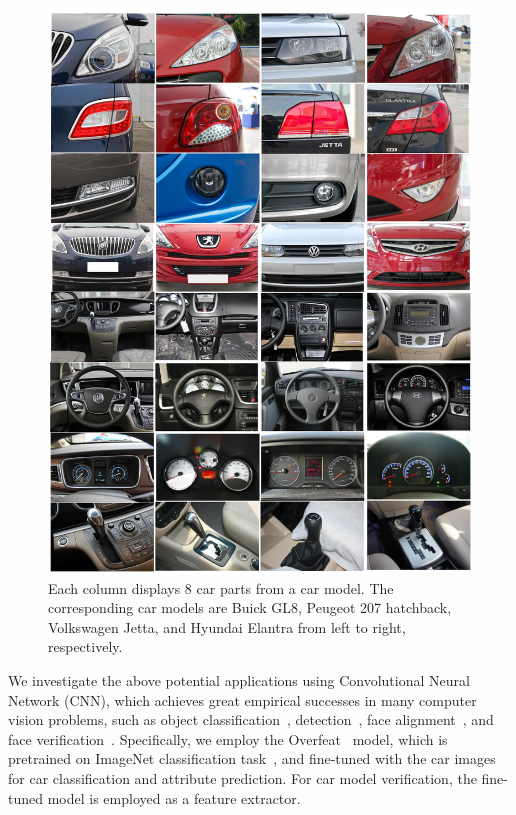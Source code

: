 \documentclass[10pt,twocolumn,letterpaper]{article}
\begin{document}
\begin{figure}[t]\centering
\includegraphics[width=0.9\linewidth]{part.pdf}
\caption{Each column displays 8 car parts from a car model. The corresponding car models are Buick GL8, Peugeot 207 hatchback, Volkswagen Jetta, and Hyundai Elantra from left to right, respectively.}
\label{fig:part}
\vspace{-3pt}
\end{figure}

We investigate the above potential applications using Convolutional Neural Network (CNN), which achieves great empirical successes in many computer vision problems, such as object classification~\cite{Krizhevsky12}, detection~\cite{rcnn14}, face alignment~\cite{ZhangECCV2014}, and face verification~\cite{Sun14,ZhuNIPS2014}.
%
Specifically, we employ the Overfeat~\cite{Sermanet13} model, which is pretrained on ImageNet classification task~\cite{Deng09}, and fine-tuned with the car images for car classification and attribute prediction. For car model verification, the fine-tuned model is employed as a feature extractor.

\end{document}
